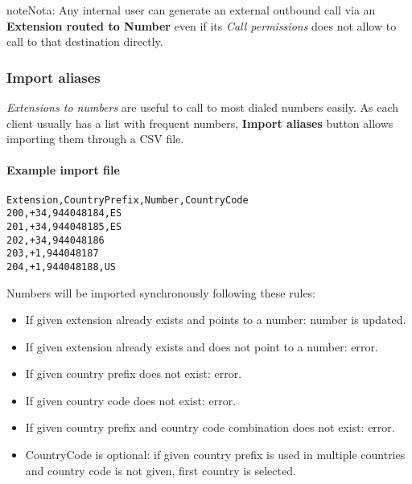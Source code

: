\documentclass[letterpaper,10pt,spanish]{sphinxmanual}
\begin{document}
\begin{notice}{note}{Nota:}
Any internal user can generate an external outbound call via an \textbf{Extension
routed to Number} even if its \emph{Call permissions} does not allow to
call to that destination directly.
\end{notice}


\subsubsection{Import aliases}
\label{administration_portal/client/vpbx/extensions:import-aliases}
\emph{Extensions to numbers} are useful to call to most dialed numbers easily. As each
client usually has a list with frequent numbers, \textbf{Import aliases} button allows
importing them through a CSV file.
\paragraph{Example import file}

\begin{Verbatim}[commandchars=\\\{\}]
Extension,CountryPrefix,Number,CountryCode
200,+34,944048184,ES
201,+34,944048185,ES
202,+34,944048186
203,+1,944048187
204,+1,944048188,US
\end{Verbatim}

Numbers will be imported synchronously following these rules:
\begin{itemize}
\item {} 
If given extension already exists and points to a number: number is updated.

\item {} 
If given extension already exists and does not point to a number: error.

\item {} 
If given country prefix does not exist: error.

\item {} 
If given country code does not exist: error.

\item {} 
If given country prefix and country code combination does not exist: error.

\item {} 
CountryCode is optional: if given country prefix is used in multiple countries
and country code is not given, first country is selected.

\end{itemize}
\end{document}
